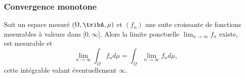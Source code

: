 \subsubsection{Convergence monotone}

\begin{theorem} \label{ThoRRDooFUvEAN}
    Soit un espace mesuré \( (\Omega,\tribA,\mu)\) et \( (f_n)\) une suite croissante de fonctions mesurables à valeurs dans \( \mathopen[ 0 , \infty \mathclose]\). Alors la limite ponctuelle \( \lim_{n\to \infty} f_n\) existe, est mesurable et
    \begin{equation}    \label{EqFHqCmLV}
        \lim_{n\to \infty} \int_{\Omega}f_nd\mu= \int_{\Omega}\lim_{n\to \infty} f_nd\mu,
    \end{equation}
    cette intégrable valant éventuellement \( \infty\).
\end{theorem}

